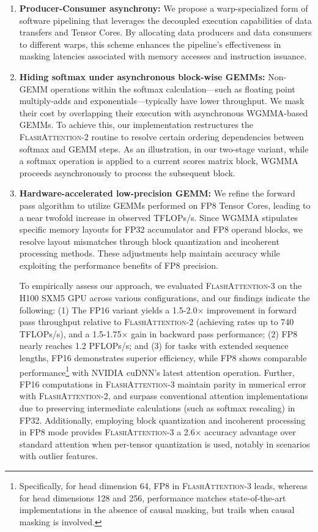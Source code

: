 \begin{enumerate}

\item \textbf{Producer-Consumer asynchrony:} We propose a warp-specialized form of software pipelining that leverages the decoupled execution capabilities of data transfers and Tensor Cores. By allocating data producers and data consumers to different warps, this scheme enhances the pipeline’s effectiveness in masking latencies associated with memory accesses and instruction issuance.

\item \textbf{Hiding softmax under asynchronous block-wise GEMMs:} Non-GEMM operations within the softmax calculation—such as floating point multiply-adds and exponentials—typically have lower throughput. We mask their cost by overlapping their execution with asynchronous WGMMA-based GEMMs. To achieve this, our implementation restructures the \textsc{FlashAttention-2} routine to resolve certain ordering dependencies between softmax and GEMM steps. As an illustration, in our two-stage variant, while a softmax operation is applied to a current scores matrix block, WGMMA proceeds asynchronously to process the subsequent block.

\item \textbf{Hardware-accelerated low-precision GEMM:} We refine the forward pass algorithm to utilize GEMMs performed on FP8 Tensor Cores, leading to a near twofold increase in observed TFLOPs/s. Since WGMMA stipulates specific memory layouts for FP32 accumulator and FP8 operand blocks, we resolve layout mismatches through block quantization and incoherent processing methods. These adjustments help maintain accuracy while exploiting the performance benefits of FP8 precision.

To empirically assess our approach, we evaluated \textsc{FlashAttention-3} on the H100 SXM5 GPU across various configurations, and our findings indicate the following: (1) The FP16 variant yields a 1.5-2.0$\times$ improvement in forward pass throughput relative to \textsc{FlashAttention-2} (achieving rates up to 740 TFLOPs/s), and a 1.5-1.75$\times$ gain in backward pass performance; (2) FP8 nearly reaches 1.2 PFLOPs/s; and (3) for tasks with extended sequence lengths, FP16 demonstrates superior efficiency, while FP8 shows comparable performance\footnote{Specifically, for head dimension 64, FP8 in \textsc{FlashAttention-3} leads, whereas for head dimensions 128 and 256, performance matches state-of-the-art implementations in the absence of causal masking, but trails when causal masking is involved.} with NVIDIA cuDNN's latest attention operation. Further, FP16 computations in \textsc{FlashAttention-3} maintain parity in numerical error with \textsc{FlashAttention-2}, and surpass conventional attention implementations due to preserving intermediate calculations (such as softmax rescaling) in FP32. Additionally, employing block quantization and incoherent processing in FP8 mode provides \textsc{FlashAttention-3} a 2.6$\times$ accuracy advantage over standard attention when per-tensor quantization is used, notably in scenarios with outlier features.


\end{enumerate}
